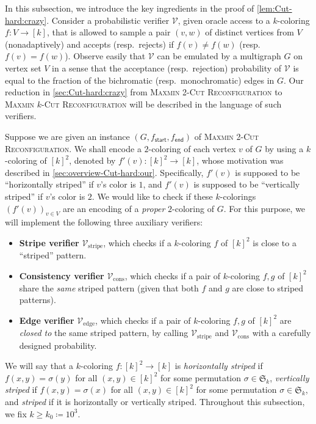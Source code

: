 \documentclass[11pt,fleqn]{article}
\renewcommand{\geq}{\geqslant}
\newcommand{\prb}[1]{\textsc{#1}\xspace}
\newcommand{\defeq}{\coloneq}
\newcommand{\sss}{\mathsf{start}}
\newcommand{\ttt}{\mathsf{end}}
\newcommand{\V}{\calV}
\newcommand{\f}{f}
\newcommand{\g}{g}
\newcommand{\kzero}{10^3}
\newcommand{\Vstripe}{\V_\mathrm{stripe}}
\newcommand{\Vcons}{\V_\mathrm{cons}}
\newcommand{\Vedge}{\V_\mathrm{edge}}
\newcommand{\MMkCutReconf}{\prb{Maxmin $k$-Cut Reconfiguration}}
\newcommand{\MMtwoCutReconf}{\prb{Maxmin 2-Cut Reconfiguration}}
\newcommand{\calV}{\mathcal{V}}
\newcommand{\frakS}{\mathfrak{S}}
\theoremstyle{definition}
\numberwithin{equation}{section}
\begin{document}
In this subsection, we introduce the key ingredients in the proof of \cref{lem:Cut-hard:crazy}.
Consider a probabilistic verifier $\V$,
given oracle access to a $k$-coloring $\f \colon V \to [k]$,
that is allowed to
sample a pair $(v,w)$ of distinct vertices from $V$ (nonadaptively) and
accepts (resp.~rejects) if $\f(v) \neq \f(w)$ (resp.~$\f(v) = \f(w)$).
Observe easily that $\V$ can be emulated by a multigraph $G$ on vertex set $V$ in a sense that
the acceptance (resp.~rejection) probability of $\V$ is equal to
the fraction of the bichromatic (resp.~monochromatic) edges in $G$.
Our reduction in \cref{sec:Cut-hard:crazy} from \MMtwoCutReconf to \MMkCutReconf 
will be described in the language of such verifiers.


Suppose we are given an instance $(G,\f_\sss,\f_\ttt)$ of \MMtwoCutReconf.
We shall encode a $2$-coloring of each vertex $v$ of $G$
by using a $k$-coloring of $[k]^2$, denoted by $\f'(v) \colon [k]^2 \to [k]$,
whose motivation was described in \cref{sec:overview-Cut-hard:our}.
Specifically,
$\f'(v)$ is supposed to be ``horizontally striped'' if $v$'s color is $1$, and
$\f'(v)$ is supposed to be ``vertically striped'' if $v$'s color is $2$.
We would like to check if
these $k$-colorings $(\f'(v))_{v \in V}$ are an encoding of a \emph{proper} $2$-coloring of $G$.
For this purpose,
we will implement the following three auxiliary verifiers:
\begin{itemize}
    \item \textbf{Stripe verifier} $\Vstripe$, which checks
        if a $k$-coloring $\f$ of $[k]^2$ is close to a ``striped'' pattern.
    \item \textbf{Consistency verifier} $\Vcons$, which checks
        if a pair of $k$-coloring $\f, \g$ of $[k]^2$
        share the \emph{same} striped pattern
        (given that both $\f$ and $\g$ are close to striped patterns).
    \item \textbf{Edge verifier} $\Vedge$, which checks
        if a pair of $k$-coloring $\f, \g$ of $[k]^2$
        are \emph{closed to} the same striped pattern,
        by calling $\Vstripe$ and $\Vcons$ with a carefully designed probability.
\end{itemize}


We will say that a $k$-coloring $\f \colon [k]^2 \to [k]$ is
\emph{horizontally striped} if 
$\f(x,y) = \sigma(y)$ for all $(x,y) \in [k]^2$
for some permutation $\sigma \in \frakS_k$,
\emph{vertically striped} if
$\f(x,y) = \sigma(x)$ for all $(x,y) \in [k]^2$
for some permutation $\sigma \in \frakS_k$, and
\emph{striped} if
it is horizontally or vertically striped.
Throughout this subsection, we fix $k \geq k_0 \defeq \kzero$.
\end{document}
